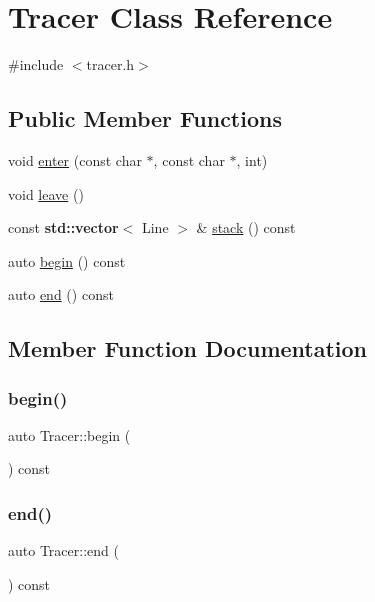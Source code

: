 \hypertarget{class_tracer}{}\section{Tracer Class Reference}
\label{class_tracer}


{\ttfamily \#include $<$tracer.\+h$>$}

\subsection*{Public Member Functions}
\begin{DoxyCompactItemize}
\item 
void \hyperlink{class_tracer_a40c10b5b975b5bb6460a4e562dc32de4}{enter} (const char $\ast$, const char $\ast$, int)
\item 
void \hyperlink{class_tracer_a436f4f1c904d748c93be33966f8a40ed}{leave} ()
\item 
const \textbf{ std\+::vector}$<$ Line $>$ \& \hyperlink{class_tracer_afaaf6df2d767ee945262c0a660cd77a9}{stack} () const
\item 
auto \hyperlink{class_tracer_a89678112c582773c6d5e27263b3dc9d1}{begin} () const
\item 
auto \hyperlink{class_tracer_ac80df028c375b7894d9d3edf5d4505bd}{end} () const
\end{DoxyCompactItemize}


\subsection{Member Function Documentation}
\mbox{\label{class_tracer_a89678112c582773c6d5e27263b3dc9d1}} 
\subsubsection{\texorpdfstring{begin()}{begin()}}
{\footnotesize\ttfamily auto Tracer\+::begin (\begin{DoxyParamCaption}{ }\end{DoxyParamCaption}) const\hspace{0.3cm}{\ttfamily [inline]}}

\mbox{\label{class_tracer_ac80df028c375b7894d9d3edf5d4505bd}} 
\subsubsection{\texorpdfstring{end()}{end()}}
{\footnotesize\ttfamily auto Tracer\+::end (\begin{DoxyParamCaption}{ }\end{DoxyParamCaption}) const\hspace{0.3cm}{\ttfamily [inline]}}

